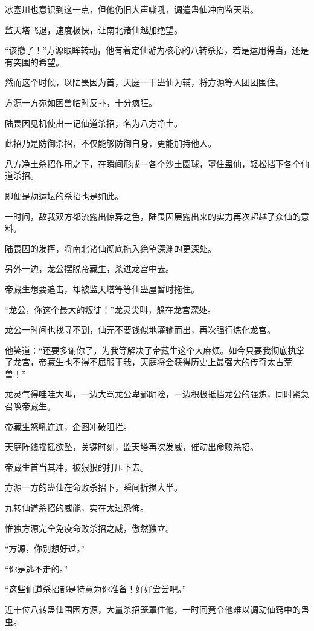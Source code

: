\begin{this_body}
冰塞川也意识到这一点，但他仍旧大声嘶吼，调遣蛊仙冲向监天塔。

监天塔飞退，速度极快，让南北诸仙越加绝望。

“该撤了！”方源眼眸转动，他有着定仙游为核心的八转杀招，若是运用得当，还是有突围的希望。

然而这个时候，以陆畏因为首，天庭一干蛊仙为辅，将方源等人团团围住。

方源一方宛如困兽临时反扑，十分疯狂。

陆畏因见机使出一记仙道杀招，名为八方净土。

此招乃是防御杀招，不仅能够防御自身，更能加持他人。

八方净土杀招作用之下，在瞬间形成一各个沙土圆球，罩住蛊仙，轻松挡下各个仙道杀招。

即便是劫运坛的杀招也是如此。

一时间，敌我双方都流露出惊异之色，陆畏因展露出来的实力再次超越了众仙的意料。

陆畏因的发挥，将南北诸仙彻底拖入绝望深渊的更深处。

另外一边，龙公摆脱帝藏生，杀进龙宫中去。

帝藏生想要追击，却被监天塔等等仙蛊屋暂时拖住。

“龙公，你这个最大的叛徒！”龙灵尖叫，躲在龙宫深处。

龙公一时间也找寻不到，仙元不要钱似地灌输而出，再次强行炼化龙宫。

他笑道：“还要多谢你了，为我等解决了帝藏生这个大麻烦。如今只要我彻底执掌了龙宫，帝藏生也不得不屈服于我，天庭将会获得历史上最强大的传奇太古荒兽！”

龙灵气得哇哇大叫，一边大骂龙公卑鄙阴险，一边积极抵挡龙公的强炼，同时紧急召唤帝藏生。

帝藏生怒吼连连，企图冲破阻拦。

天庭阵线摇摇欲坠，关键时刻，监天塔再次发威，催动出命败杀招。

帝藏生首当其冲，被狠狠的打压下去。

方源一方的蛊仙在命败杀招下，瞬间折损大半。

九转仙道杀招的威能，实在太过恐怖。

惟独方源完全免疫命败杀招之威，傲然独立。

“方源，你别想好过。”

“你是逃不走的。”

“这些仙道杀招都是特意为你准备！好好尝尝吧。”

近十位八转蛊仙围困方源，大量杀招笼罩住他，一时间竟令他难以调动仙窍中的蛊虫。


\end{this_body}
